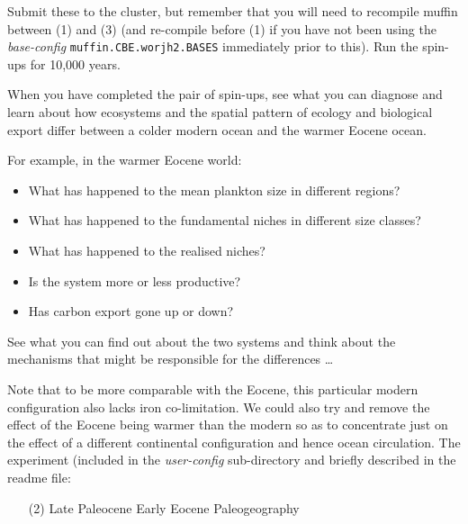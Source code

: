 \documentclass[11pt,fleqn]{book} %
\begin{document}
\noindent Submit these to the cluster, but remember that you will need to recompile muffin between (1) and (3) (and re-compile before (1) if you have not been using the \textit{base-config} \texttt{muffin.CBE.worjh2.BASES} immediately prior to this). Run the spin-ups for 10,000 years.

\vspace{2mm}
\noindent When you have completed the pair of spin-ups, see what you can diagnose and learn about how ecosystems and the spatial pattern of ecology and biological export differ between a colder modern ocean and the warmer Eocene ocean.

For example, in the warmer Eocene world:

\vspace{1mm}
\begin{itemize}
\item What has happened to the mean plankton size in different regions?
\item What has happened to the fundamental niches in different size classes?
\item What has happened to the realised niches?
\item Is the system more or less productive?
\item Has carbon export gone up or down?
\end{itemize}
\vspace{1mm}

See what you can find out about the two systems and think about the mechanisms that might be responsible for the differences \dots

\vspace{8mm}
\pagebreak

Note that to be more comparable with the Eocene, this particular modern configuration also lacks iron co-limitation. We could also try and remove the effect of the Eocene being warmer than the modern so as to concentrate just on the effect of a different continental configuration and hence ocean circulation. The experiment (included in the \textit{user-config} sub-directory and briefly described in the \textsf{\footnotesize readme } file:

\vspace{1mm}
\begin{itemize}[noitemsep]
\item[(2)] \textsf{\footnotesize Late Paleocene Early Eocene Paleogeography}
\end{itemize}
\vspace{1mm}
\end{document}
